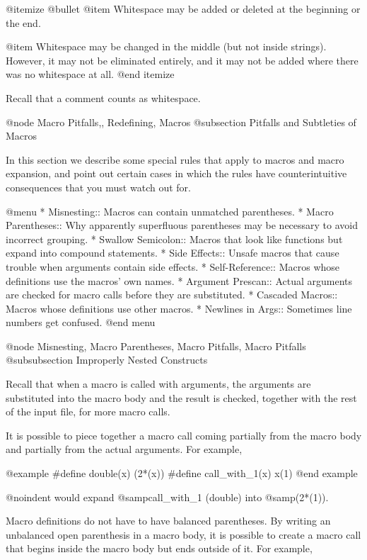 {@itemize @bullet
@item
Whitespace may be added or deleted at the beginning or the end.

@item
Whitespace may be changed in the middle (but not inside strings).
However, it may not be eliminated entirely, and it may not be added
where there was no whitespace at all.
@end itemize

Recall that a comment counts as whitespace.

@node Macro Pitfalls,, Redefining, Macros
@subsection Pitfalls and Subtleties of Macros

In this section we describe some special rules that apply to macros and
macro expansion, and point out certain cases in which the rules have
counterintuitive consequences that you must watch out for.

@menu
* Misnesting::        Macros can contain unmatched parentheses.
* Macro Parentheses:: Why apparently superfluous parentheses
                         may be necessary to avoid incorrect grouping.
* Swallow Semicolon:: Macros that look like functions
                         but expand into compound statements.
* Side Effects::      Unsafe macros that cause trouble when
                         arguments contain side effects.
* Self-Reference::    Macros whose definitions use the macros' own names.
* Argument Prescan::  Actual arguments are checked for macro calls
                         before they are substituted.
* Cascaded Macros::   Macros whose definitions use other macros.
* Newlines in Args::  Sometimes line numbers get confused.
@end menu

@node Misnesting, Macro Parentheses, Macro Pitfalls, Macro Pitfalls
@subsubsection Improperly Nested Constructs

Recall that when a macro is called with arguments, the arguments are
substituted into the macro body and the result is checked, together with
the rest of the input file, for more macro calls.

It is possible to piece together a macro call coming partially from the
macro body and partially from the actual arguments.  For example,

@example
#define double(x) (2*(x))
#define call_with_1(x) x(1)
@end example

@noindent
would expand @samp{call_with_1 (double)} into @samp{(2*(1))}.

Macro definitions do not have to have balanced parentheses.  By writing an
unbalanced open parenthesis in a macro body, it is possible to create a
macro call that begins inside the macro body but ends outside of it.  For
example,

}
